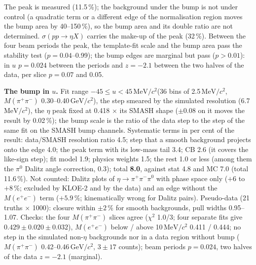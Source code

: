 \documentclass[11pt,a4paper]{article}
\newcommand{\piz}{\ensuremath{\pi^{0}}\xspace}
\newcommand{\pipi}{\ensuremath{\pi^{+}\pi^{-}}\xspace}
\newcommand{\Mee}{\ensuremath{M(e^{+}e^{-})}\xspace}
\newcommand{\Mpipi}{\ensuremath{M(\pi^{+}\pi^{-})}\xspace}
\newcommand{\GeVcc}{\ensuremath{\mathrm{GeV}/c^{2}}\xspace}
\newcommand{\MeVcc}{\ensuremath{\mathrm{MeV}/c^{2}}\xspace}
\newcommand{\sigeta}{\ensuremath{\sigma(pp\to\eta X)}\xspace}
\begin{document}
The peak is measured (11.5\,\%); the background under the bump is not under control (a quadratic term or a different edge of the normalisation
region moves the bump area by 40--150\,\%), so the bump area and its double ratio are not determined. \sigeta carries the make-up of the peak
(32\,\%). Between the four beam periods the peak, the template-fit scale and the bump area pass the stability test ($p=0.04$--0.99); the
bump edges are marginal but pass ($p>0.01$): in $u$ $p=0.024$ between the periods and $z=-2.1$ between the two halves of the data, per slice
$p=0.07$ and 0.05.

\textbf{The bump in $u$.} Fit range $-45\le u<45$\,\MeVcc (36 bins of 2.5\,\MeVcc, \Mpipi 0.30--0.40\,\GeVcc), the step smeared by the simulated
resolution (6.7\,\MeVcc), the $\eta$ peak fixed at 0.418 $\times$ its SMASH shape ($\pm0.08$ on it moves the result by 0.02\,\%); the bump scale is the
ratio of the data step to the step of the same fit on the SMASH bump channels. Systematic terms in per cent of the result: data/SMASH resolution
ratio 4.5; step that a smooth background projects onto the edge 4.0; the peak term with its low-mass tail 3.4; CB 2.6 (it covers the like-sign
step); fit model 1.9; physics weights 1.5; the rest 1.0 or less (among them the \piz Dalitz angle correction, 0.3); total \textbf{8.0}, against
stat 4.8 and MC 7.0 (total 11.6\,\%). Not counted: Dalitz plots of $\eta\to\pipi\piz$ with phase space only ($+6$ to $+8$\,\%; excluded by KLOE-2
and by the data) and an edge without the \Mee term ($+5.9$\,\%; kinematically wrong for Dalitz pairs). Pseudo-data (21 truths $\times$ 1000):
closure within $\pm2$\,\% for smooth backgrounds, pull widths 0.95--1.07. Checks: the four \Mpipi slices agree ($\chi^2$ 1.0/3; four separate fits
give $0.429\pm0.020\pm0.032$), \Mee below / above 10\,\MeVcc 0.411 / 0.444; no step in the simulated non-$\eta$ backgrounds nor in a data region
without bump (\Mpipi 0.42--0.46\,\GeVcc, $3\pm17$ counts); beam periods $p=0.024$, two halves of the data $z=-2.1$ (marginal).
\end{document}
